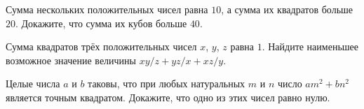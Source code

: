 


\begin{problems}

\item
Сумма нескольких положительных чисел равна $10$, а сумма их квадратов
больше $20$.
Докажите, что сумма их кубов больше $40$.

\item
Сумма квадратов трёх положительных чисел $x$, $y$, $z$ равна $1$.
Найдите наименьшее возможное значение величины $x y / z + y z / x + x z / y$. 

\item
Целые числа $a$ и $b$ таковы, что при любых натуральных $m$ и $n$
число $a m^2 + b n^2$ является точным квадратом.
Докажите, что одно из этих чисел равно нулю.

\end{problems}

